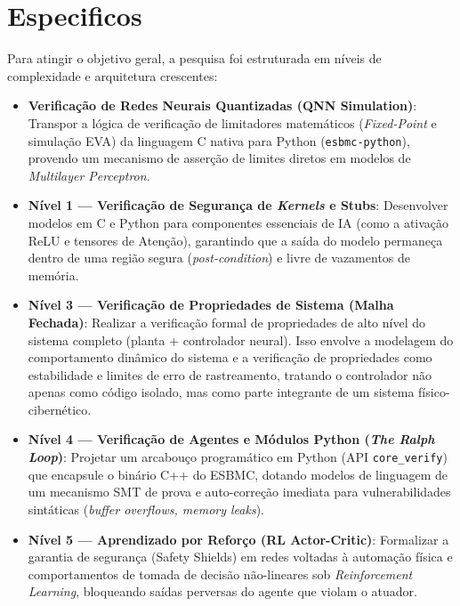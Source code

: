 \section{Especificos}

Para atingir o objetivo geral, a pesquisa foi estruturada em níveis de complexidade e arquitetura crescentes:

\begin{itemize}
    \item \textbf{Verificação de Redes Neurais Quantizadas (QNN Simulation)}: Transpor a lógica de verificação de limitadores matemáticos (\textit{Fixed-Point} e simulação EVA) da linguagem C nativa para Python (\texttt{esbmc-python}), provendo um mecanismo de asserção de limites diretos em modelos de \textit{Multilayer Perceptron}.
    
    \item \textbf{Nível 1 — Verificação de Segurança de \textit{Kernels} e Stubs}: Desenvolver modelos em C e Python para componentes essenciais de IA (como a ativação ReLU e tensores de Atenção), garantindo que a saída do modelo permaneça dentro de uma região segura (\textit{post-condition}) e livre de vazamentos de memória.
    
    \item \textbf{Nível 3 — Verificação de Propriedades de Sistema (Malha Fechada)}: Realizar a verificação formal de propriedades de alto nível do sistema completo (planta + controlador neural). Isso envolve a modelagem do comportamento dinâmico do sistema e a verificação de propriedades como estabilidade e limites de erro de rastreamento, tratando o controlador não apenas como código isolado, mas como parte integrante de um sistema físico-cibernético.
    
    \item \textbf{Nível 4 — Verificação de Agentes e Módulos Python (\textit{The Ralph Loop})}: Projetar um arcabouço programático em Python (API \texttt{core\_verify}) que encapsule o binário C++ do ESBMC, dotando modelos de linguagem de um mecanismo SMT de prova e auto-correção imediata para vulnerabilidades sintáticas (\textit{buffer overflows, memory leaks}).
    
    \item \textbf{Nível 5 — Aprendizado por Reforço (RL Actor-Critic)}: Formalizar a garantia de segurança (Safety Shields) em redes voltadas à automação física e comportamentos de tomada de decisão não-lineares sob \textit{Reinforcement Learning}, bloqueando saídas perversas do agente que violam o atuador.
\end{itemize}
